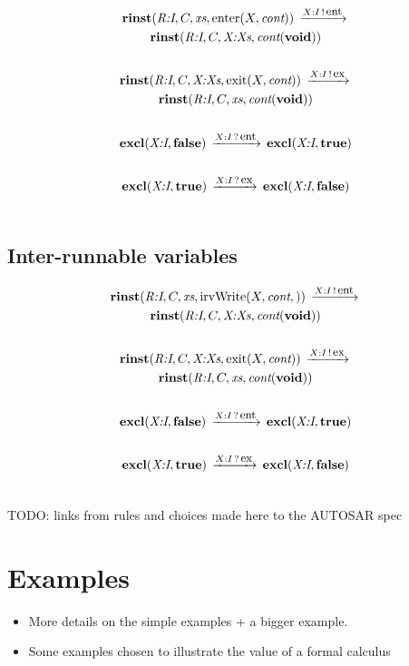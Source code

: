 \documentclass[twocolumn]{article}
\begin{document}
\begin{gather*}
	\rinst{\adr{R:I}}{C}{\Xs}{\Enter{X}{\Cont}}  \red{\say{X:I}{\ent}}  \\
		\rinst{\adr{R:I}}{C}{\adr{X:Xs}}{\Cont(\void)} \\
	\\
	\rinst{\adr{R:I}}{C}{\adr{X:Xs}}{\Exit{X}{\Cont}}  \red{\say{X:I}{\ex}}  \\
		\rinst{\adr{R:I}}{C}{\Xs}{\Cont(\void)} \\
	\\
	\excl{\adr{X:I}}{\false} \red{\hear{X:I}{\ent}} \excl{\adr{X:I}}{\true} \\
	\\
	\excl{\adr{X:I}}{\true} \red{\hear{X:I}{\ex}} \excl{\adr{X:I}}{\false} \\
	\\
\end{gather*}

\subsection{Inter-runnable variables}

\begin{gather*}
	\rinst{\adr{R:I}}{C}{\Xs}{\IrvWrite{X}{\Cont}}  \red{\say{X:I}{\ent}}  \\
		\rinst{\adr{R:I}}{C}{\adr{X:Xs}}{\Cont(\void)} \\
	\\
	\rinst{\adr{R:I}}{C}{\adr{X:Xs}}{\Exit{X}{\Cont}}  \red{\say{X:I}{\ex}}  \\
		\rinst{\adr{R:I}}{C}{\Xs}{\Cont(\void)} \\
	\\
	\excl{\adr{X:I}}{\false} \red{\hear{X:I}{\ent}} \excl{\adr{X:I}}{\true} \\
	\\
	\excl{\adr{X:I}}{\true} \red{\hear{X:I}{\ex}} \excl{\adr{X:I}}{\false} \\
	\\
\end{gather*}


TODO: links from rules and choices made here to the AUTOSAR spec

\section{Examples}
\label{sec:Examples}

\begin{itemize}
\item More details on the simple examples + a bigger example.
\item Some examples chosen to illustrate the value of a formal calculus
\end{itemize}
\end{document}
